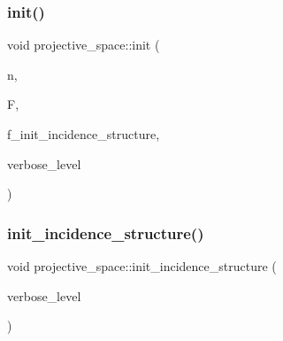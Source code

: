 \subsubsection{\texorpdfstring{init()}{init()}}
{\footnotesize\ttfamily void projective\+\_\+space\+::init (\begin{DoxyParamCaption}\item[{\mbox{\hyperlink{galois_8h_a09fddde158a3a20bd2dcadb609de11dc}{I\+NT}}}]{n,  }\item[{\mbox{\hyperlink{classfinite__field}{finite\+\_\+field}} $\ast$}]{F,  }\item[{\mbox{\hyperlink{galois_8h_a09fddde158a3a20bd2dcadb609de11dc}{I\+NT}}}]{f\+\_\+init\+\_\+incidence\+\_\+structure,  }\item[{\mbox{\hyperlink{galois_8h_a09fddde158a3a20bd2dcadb609de11dc}{I\+NT}}}]{verbose\+\_\+level }\end{DoxyParamCaption})}

\mbox{\label{classprojective__space_a1e59490325e045cc52674a3706780aed}} 
\subsubsection{\texorpdfstring{init\+\_\+incidence\+\_\+structure()}{init\_incidence\_structure()}}
{\footnotesize\ttfamily void projective\+\_\+space\+::init\+\_\+incidence\+\_\+structure (\begin{DoxyParamCaption}\item[{\mbox{\hyperlink{galois_8h_a09fddde158a3a20bd2dcadb609de11dc}{I\+NT}}}]{verbose\+\_\+level }\end{DoxyParamCaption})}

\mbox{\label{classprojective__space_a6bc7d77bb5676fd0ff22065ed6253d8b}} 
